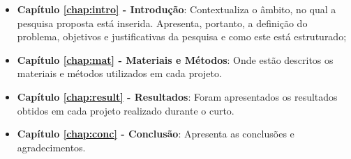 \begin{itemize}

  \item \textbf{Capítulo \ref{chap:intro} - Introdução}: Contextualiza o âmbito, no qual a pesquisa proposta está inserida. Apresenta, portanto, a definição do problema, objetivos e justificativas da pesquisa e como este \thetypeworkthree está estruturado;
  \item \textbf{Capítulo \ref{chap:mat} - Materiais e Métodos}: Onde estão descritos os materiais e métodos utilizados em cada projeto.
  \item \textbf{Capítulo \ref{chap:result} - Resultados}: Foram apresentados os resultados obtidos em cada projeto realizado durante o curto.
  \item \textbf{Capítulo \ref{chap:conc} - Conclusão}: Apresenta as conclusões e agradecimentos.

\end{itemize}